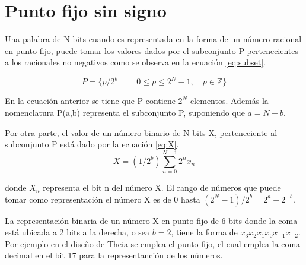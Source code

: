 \section{Punto fijo sin signo}

Una palabra de N-bits cuando es representada en la forma de un número racional en punto fijo, puede tomar los valores dados por el subconjunto P pertenecientes a los racionales no negativos como se observa en la ecuación \eqref{eq:subset}.

\begin{equation}
\label{eq:subset}
	P = \{p/2^{b}\quad |\quad 0 \leq p \leq 2^{N}-1, \quad p \in \mathbb{Z}\}
\end{equation}

En la ecuación anterior se tiene que P contiene $2^{N}$ elementos. Además la nomenclatura P(a,b) representa el subconjunto P, suponiendo que $a=N-b$.

Por otra parte, el valor de un número binario de N-bits X, perteneciente al subconjunto P está dado por la ecuación \eqref{eq:X}.
\begin{equation}
\label{eq:X}
   X = (1/2^{b}){\sum^{N-1}_{n=0}} 2^{n} x_{n}
\end{equation}

donde $X_n$ representa el bit n del número X. El rango de números que puede tomar como representación el número X es de 0 hasta $(2^{N}-1)/2^{b}=2^{a}-2^{-b}$.

La representación binaria de un número X en punto fijo de 6-bits donde la coma está ubicada a 2 bits a la derecha, o sea $b=2$, tiene la forma de $x_{3}x_{2}x_{1}x_{0}x_{-1}x_{-2}$. Por ejemplo en el diseño de Theia se emplea el punto fijo, el cual emplea la coma decimal en el bit 17 para la representanción de los números.






